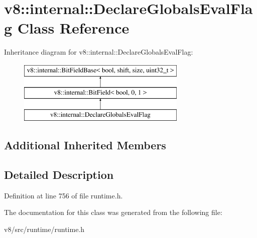 \hypertarget{classv8_1_1internal_1_1DeclareGlobalsEvalFlag}{}\section{v8\+:\+:internal\+:\+:Declare\+Globals\+Eval\+Flag Class Reference}
\label{classv8_1_1internal_1_1DeclareGlobalsEvalFlag}
Inheritance diagram for v8\+:\+:internal\+:\+:Declare\+Globals\+Eval\+Flag\+:\begin{figure}[H]
\begin{center}
\leavevmode
\includegraphics[height=3.000000cm]{classv8_1_1internal_1_1DeclareGlobalsEvalFlag}
\end{center}
\end{figure}
\subsection*{Additional Inherited Members}


\subsection{Detailed Description}


Definition at line 756 of file runtime.\+h.



The documentation for this class was generated from the following file\+:\begin{DoxyCompactItemize}
\item 
v8/src/runtime/runtime.\+h\end{DoxyCompactItemize}
